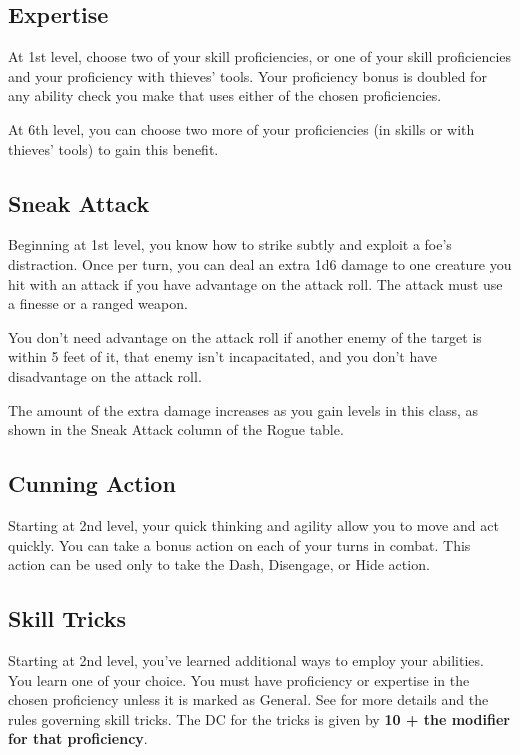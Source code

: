 \subsection{Expertise}

At 1st level, choose two of your skill proficiencies, or one of your skill proficiencies and your proficiency with thieves’ tools. Your proficiency bonus is doubled for any ability check you make that uses either of the chosen proficiencies.

At 6th level, you can choose two more of your proficiencies (in skills or with thieves’ tools) to gain this benefit.

\subsection{Sneak Attack}

Beginning at 1st level, you know how to strike subtly and exploit a foe’s distraction. Once per turn, you can deal an extra 1d6 damage to one creature you hit with an attack if you have advantage on the attack roll. The attack must use a finesse or a ranged weapon.

You don’t need advantage on the attack roll if another enemy of the target is within 5 feet of it, that enemy isn’t incapacitated, and you don’t have disadvantage on the attack roll.

The amount of the extra damage increases as you gain levels in this class, as shown in the Sneak Attack column of the Rogue table.

\subsection{Cunning Action}

Starting at 2nd level, your quick thinking and agility allow you to move and act quickly. You can take a bonus action on each of your turns in combat. This action can be used only to take the Dash, Disengage, or Hide action.

\subsection{Skill Tricks}

Starting at 2nd level, you've learned additional ways to employ your abilities. You learn one  of your choice. You must have proficiency or expertise in the chosen proficiency unless it is marked as General. See  for more details and the rules governing skill tricks. The DC for the tricks is given by \textbf{10 + the modifier for that proficiency}.

